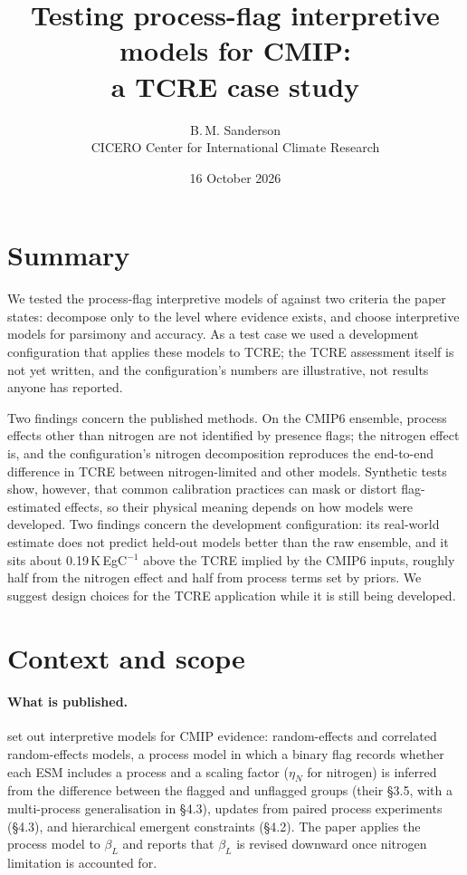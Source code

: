 \documentclass[11pt,a4paper]{article}
\title{Testing process-flag interpretive models for CMIP:\\ a TCRE case study}
\author{B.\,M. Sanderson\\ \small CICERO Center for International Climate Research}
\date{16 October 2026}
\newcommand{\Kpe}{K\,EgC$^{-1}$}
\newcommand{\bL}{$\beta_L$}
\newcommand{\etaN}{$\eta_N$}
\begin{document}
\maketitle

\section*{Summary}

We tested the process-flag interpretive models of \citet{marvel2026} against two criteria the paper states: decompose only to the level where evidence exists, and choose interpretive models for parsimony and accuracy. As a test case we used a development configuration that applies these models to TCRE; the TCRE assessment itself is not yet written, and the configuration's numbers are illustrative, not results anyone has reported.

Two findings concern the published methods. On the CMIP6 ensemble, process effects other than nitrogen are not identified by presence flags; the nitrogen effect is, and the configuration's nitrogen decomposition reproduces the end-to-end difference in TCRE between nitrogen-limited and other models. Synthetic tests show, however, that common calibration practices can mask or distort flag-estimated effects, so their physical meaning depends on how models were developed. Two findings concern the development configuration: its real-world estimate does not predict held-out models better than the raw ensemble, and it sits about 0.19\,\Kpe{} above the TCRE implied by the CMIP6 inputs, roughly half from the nitrogen effect and half from process terms set by priors. We suggest design choices for the TCRE application while it is still being developed.

\section*{Context and scope}

\paragraph{What is published.} \citet{marvel2026} set out interpretive models for CMIP evidence: random-effects and correlated random-effects models, a process model in which a binary flag records whether each ESM includes a process and a scaling factor (\etaN{} for nitrogen) is inferred from the difference between the flagged and unflagged groups (their \S3.5, with a multi-process generalisation in \S4.3), updates from paired process experiments (\S4.3), and hierarchical emergent constraints (\S4.2). The paper applies the process model to \bL{} and reports that \bL{} is revised downward once nitrogen limitation is accounted for.
\end{document}
